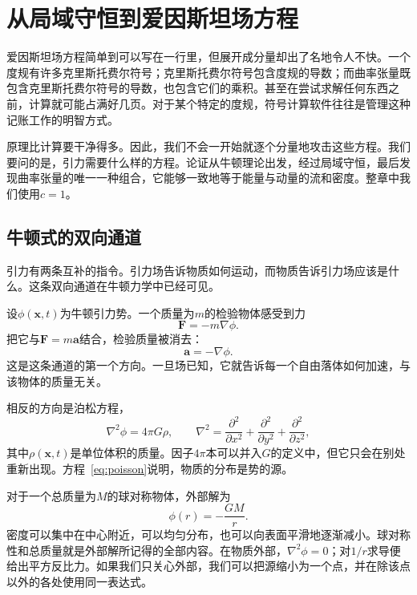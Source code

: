 \chapter{从局域守恒到爱因斯坦场方程}

爱因斯坦场方程简单到可以写在一行里，但展开成分量却出了名地令人不快。一个度规有许多克里斯托费尔符号；克里斯托费尔符号包含度规的导数；而曲率张量既包含克里斯托费尔符号的导数，也包含它们的乘积。甚至在尝试求解任何东西之前，计算就可能占满好几页。对于某个特定的度规，符号计算软件往往是管理这种记账工作的明智方式。

原理比计算要干净得多。因此，我们不会一开始就逐个分量地攻击这些方程。我们要问的是，引力需要什么样的方程。论证从牛顿理论出发，经过局域守恒，最后发现曲率张量的唯一一种组合，它能够一致地等于能量与动量的流和密度。整章中我们使用\(c=1\)。

\section{牛顿式的双向通道}

引力有两条互补的指令。引力场告诉物质如何运动，而物质告诉引力场应该是什么。这条双向通道在牛顿力学中已经可见。

设\(\phi(\mathbf{x},t)\)为牛顿引力势。一个质量为\(m\)的检验物体感受到力
\begin{equation}
 \mathbf{F}=-m\nabla\phi.
\end{equation}
把它与\(\mathbf{F}=m\mathbf{a}\)结合，检验质量被消去：
\begin{equation}
 \mathbf{a}=-\nabla\phi.
\end{equation}
这是这条通道的第一个方向。一旦场已知，它就告诉每一个自由落体如何加速，与该物体的质量无关。

相反的方向是泊松方程，
\begin{equation}
 \nabla^2\phi=4\pi G\rho,
 \qquad
 \nabla^2=
 \frac{\partial^2}{\partial x^2}
 +\frac{\partial^2}{\partial y^2}
 +\frac{\partial^2}{\partial z^2},
 \label{eq:poisson}
\end{equation}
其中\(\rho(\mathbf{x},t)\)是单位体积的质量。因子\(4\pi\)本可以并入\(G\)的定义中，但它只会在别处重新出现。方程~\eqref{eq:poisson}说明，物质的分布是势的源。

对于一个总质量为\(M\)的球对称物体，外部解为
\begin{equation}
 \phi(r)=-\frac{GM}{r}.
 \label{eq:newton-potential}
\end{equation}
密度可以集中在中心附近，可以均匀分布，也可以向表面平滑地逐渐减小。球对称性和总质量就是外部解所记得的全部内容。在物质外部，\(\nabla^2\phi=0\)；对\(1/r\)求导便给出平方反比力。如果我们只关心外部，我们可以把源缩小为一个点，并在除该点以外的各处使用同一表达式。

